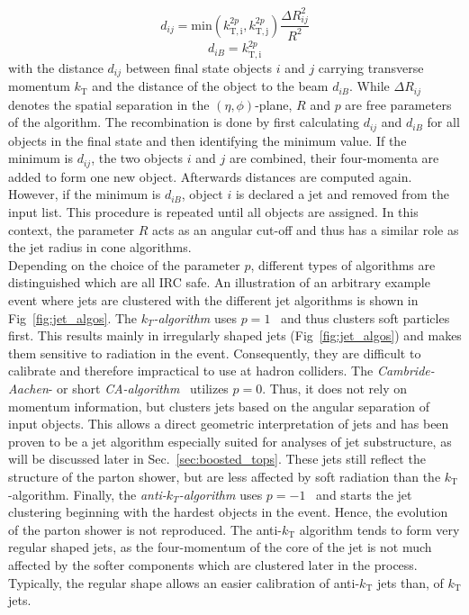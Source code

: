 \begin{description}
\begin{equation*}
d_{ij} = \mathrm{min}(k_\mathrm{T,i}^{2p}, k_\mathrm{T,j}^{2p}) \frac{\Delta R_{ij}^2}{R^2}
\end{equation*}
\begin{equation*}
d_{iB} = k_\mathrm{T,i}^{2p}
\end{equation*}
with the distance $d_{ij}$ between final state objects $i$ and $j$ carrying transverse momentum $k_\mathrm{T}$ and the distance of the object to the beam $d_{iB}$. While $\Delta R_{ij}$ denotes the spatial separation in the $(\eta, \phi)$-plane, $R$ and $p$ are free parameters of the algorithm. The recombination is done by first calculating $d_{ij}$ and $d_{iB}$ for all objects in the final state and then identifying the minimum value. If the minimum is $d_{ij}$, the two objects $i$ and $j$ are combined, \ie their four-momenta are added to form one new object. Afterwards distances are computed again. However, if the minimum is $d_{iB}$, object $i$ is declared a jet and removed from the input list. This procedure is repeated until all objects are assigned. In this context, the parameter $R$ acts as an angular cut-off and thus has a similar role as the jet radius in cone algorithms. \\
Depending on the choice of the parameter $p$, different types of algorithms are distinguished which are all IRC safe. An illustration of an arbitrary example event where jets are clustered with the different jet algorithms is shown in Fig~\ref{fig:jet_algos}. The $k_T$\textit{-algorithm} uses $p = 1$~\cite{PhysRevD.48.3160} and thus clusters soft particles first. This results mainly in irregularly shaped jets (\cf Fig~\ref{fig:jet_algos}) and makes them sensitive to radiation in the event. Consequently, they are difficult to calibrate and therefore impractical to use at hadron colliders. The \textit{Cambride-Aachen}- or short \textit{CA-algorithm}~\cite{Dokshitzer:1997in, Wobisch:1998wt} utilizes $p = 0$. Thus, it does not rely on momentum information, but clusters jets based on the angular separation of input objects. This allows a direct geometric interpretation of jets and has been proven to be a jet algorithm especially suited for analyses of jet substructure, as will be discussed later in Sec.~\ref{sec:boosted_tops}. These jets still reflect the structure of the parton shower, but are less affected by soft radiation than the $k_\mathrm{T}$-algorithm. Finally, the \textit{anti-$k_T$-algorithm} uses $p = -1$~\cite{1126-6708-2008-04-063} and starts the jet clustering beginning with the hardest objects in the event. Hence, the evolution of the parton shower is not reproduced. The anti-$k_\mathrm{T}$ algorithm tends to form very regular shaped jets, as the four-momentum of the core of the jet is not much affected by the softer components which are clustered later in the process. Typically, the regular shape allows an easier calibration of anti-$k_\mathrm{T}$ jets than, \eg of $k_\mathrm{T}$ jets. 
\end{description}

